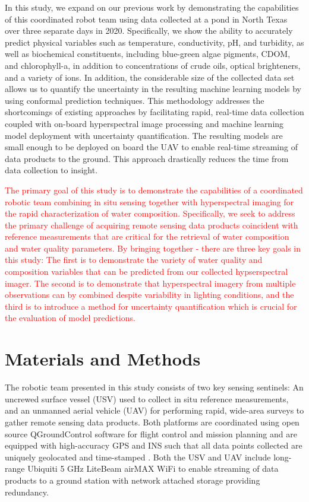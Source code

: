 \documentclass[remotesensing,article,submit,pdftex,moreauthors]{Definitions/mdpi}
\begin{document}
In this study, we expand on our previous work by demonstrating the capabilities of this coordinated robot team using data collected at a pond in North Texas over three separate days in 2020. Specifically, we show the ability to accurately predict physical variables such as temperature, conductivity, pH, and turbidity, as well as biochemical constituents, including blue-green algae pigments, CDOM, and chlorophyll-a, in addition to concentrations of crude oils, optical brighteners, and a variety of ions. In addition, the considerable size of the collected data set allows us to quantify the uncertainty in the resulting machine learning models by using conformal prediction techniques. This methodology addresses the shortcomings of existing approaches by facilitating rapid, real-time data collection coupled with on-board hyperspectral image processing and machine learning model deployment with uncertainty quantification. The resulting models are small enough to be deployed on board the UAV to enable real-time streaming of data products to the ground. This approach drastically reduces the time from data collection to insight.

\textcolor{red}{The primary goal of this study is to demonstrate the capabilities of a coordinated robotic team combining in situ sensing together with hyperspectral imaging for the rapid characterization of water composition. Specifically, we seek to address the primary challenge of acquiring remote sensing data products coincident with reference measurements that are critical for the retrieval of water composition and water quality parameters. By bringing together
- there are three key goals in this study: The first is to demonstrate the variety of water quality and composition variables that can be predicted from our collected hypserspectral imager. The second is to demonstrate that hyperspectral imagery from multiple observations can by combined despite variability in lighting conditions, and the third is to introduce a method for uncertainty quantification which is crucial for the evaluation of model predictions. 
} 



\section{Materials and Methods}

 The robotic team presented in this study consists of two key sensing sentinels: An uncrewed surface vessel (USV) used to collect in situ reference measurements, and an unmanned aerial vehicle (UAV) for performing rapid, wide-area surveys to gather remote sensing data products. Both platforms are coordinated using open source QGroundControl software for flight control and mission planning and are equipped with high-accuracy GPS and INS such that all data points collected are uniquely geolocated and time-stamped \cite{qgroundcontrol}. Both the USV and UAV include long-range Ubiquiti 5 GHz LiteBeam airMAX WiFi to enable streaming of data products to a ground station with network attached storage providing redundancy.
\end{document}
